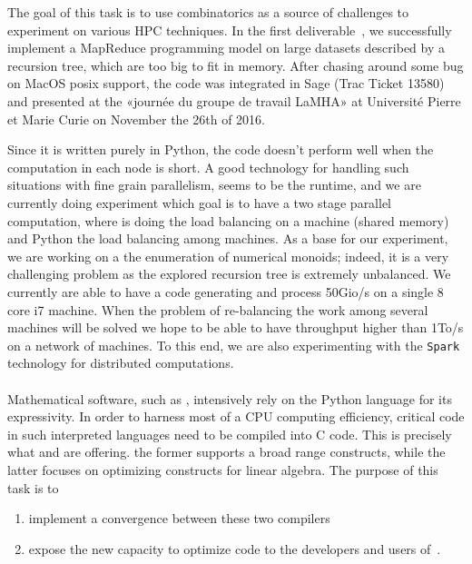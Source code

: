 \documentclass{deliverablereport}
\begin{document}
  The goal of this task is to use combinatorics as a source of challenges to
  experiment on various HPC techniques. In the first
  deliverable~, we successfully implement a
  MapReduce programming model on large datasets described by a recursion
  tree, which are too big to fit in memory. After chasing around some bug on
  MacOS posix support, the code was integrated in Sage (Trac Ticket 13580) and
  presented at the «journée du groupe de travail LaMHA» at Université Pierre et
  Marie Curie on November the 26th of 2016.

  Since it is written purely in Python, the code doesn't perform well when the
  computation in each node is short. A good technology for handling such
  situations with fine grain parallelism, seems to be the 
   runtime, and we are currently doing experiment which goal is to have a two
  stage parallel computation, where  is doing the load balancing on a
  machine (shared memory) and Python the load balancing among machines. As a
  base for our experiment, we are working on a the enumeration of numerical
  monoids; indeed, it is a very challenging problem as the explored recursion
  tree is extremely unbalanced. We currently are able to have a code
  generating and process 50Gio/s on a single 8 core i7 machine. When the
  problem of re-balancing the work among several machines will be solved we
  hope to be able to have throughput higher than 1To/s on a network of machines.
  To this end, we are also experimenting with the \texttt{Spark}
  technology for distributed computations.

  \paragraph{}

Mathematical software, such as \Sage, intensively rely on the Python
language for its expressivity. In order to harness most of a CPU computing
efficiency, critical code in such interpreted languages need to be compiled into
C code. This is precisely what \Cython and \Pythran are offering. the former
supports a broad range \Python constructs, while the latter focuses on optimizing
\Numpy constructs for linear algebra.
The purpose of this task is to
\begin{enumerate}
\item\label{pythran:cython} implement a convergence between these two compilers
\item\label{pythran:sage} expose the new capacity to optimize \Numpy code to
  the developers and  users of~\Sage.
\end{enumerate}
\end{document}
